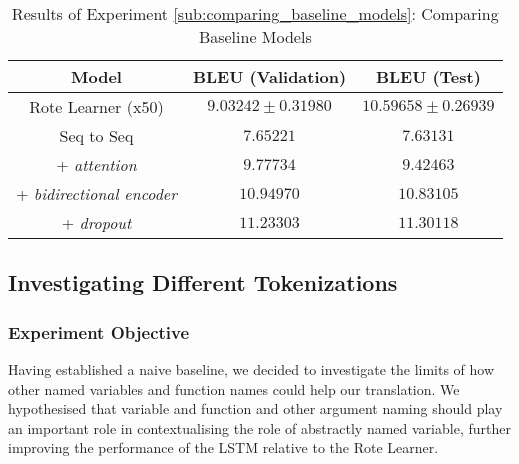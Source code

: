 \begin{table}[!ht]
\begin{center}
\begin{tabular}{ c | c | c }
    Model                             & BLEU (Validation)  & BLEU (Test)    \\
    \hline
    Rote Learner (x50)                & $ 9.03242 \pm  0.31980 $ & $ 10.59658 \pm 0.26939 $   \\
    \hline
    Seq to Seq                        & $ 7.65221 $  & $ 7.63131  $ \\
    + \textit{attention}              & $ 9.77734 $  & $ 9.42463  $ \\
    + \textit{bidirectional encoder}  & $ 10.94970 $ & $ 10.83105 $ \\
    + \textit{dropout}                & $ 11.23303 $ & $ 11.30118 $ \\
    \hline
\end{tabular}
\caption {Results of Experiment \ref{sub:comparing_baseline_models}: Comparing Baseline Models }
\label{table:name_baseline}
\end{center}
\end{table}


\subsection{Investigating Different Tokenizations} %
\label{sub:investigating_different_tokenizations}

\subsubsection{Experiment Objective} %

Having established a naive baseline, we decided to investigate the limits of how other named variables and function names could help our translation.
We hypothesised that variable and function and other argument naming should play an important role in contextualising the role of abstractly named variable, further improving the performance of the LSTM relative to the Rote Learner.

